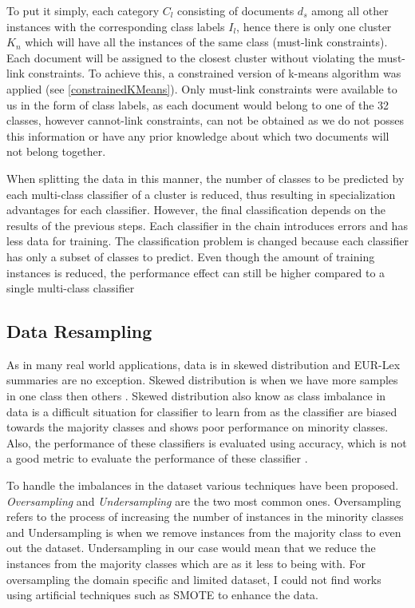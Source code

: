 
To put it simply, each category $C_{l}$ consisting of documents $d_{s}$ among all other instances with the corresponding class labels $I_{l}$, hence there is only one cluster $K_{n}$ which will have all the instances of the same class (must-link constraints). Each document will be assigned to the closest cluster without violating the must-link constraints. To achieve this, a constrained version of k-means algorithm was applied (see \ref{constrainedKMeans}). Only must-link constraints were available to us in the form of class labels, as each document would belong to one of the 32 classes, however cannot-link constraints, can not be obtained as we do not posses this information or have any prior knowledge about which two documents will not belong together. 

When splitting the data in this manner, the number of classes to be predicted by each multi-class classifier of a cluster is reduced, thus resulting in specialization advantages for each classifier. However, the final classification depends on the results of the previous steps. Each classifier in the chain introduces errors and has less data for training. The classification problem is changed because each classifier has only a subset of classes to predict. Even though the amount of training instances is reduced, the performance effect can still be higher compared to a single multi-class classifier

\subsection*{Data Resampling}

As in many real world applications, data is in skewed distribution and EUR-Lex summaries are no exception. Skewed distribution is when we have more samples in one class then others \cite{wang2012multiclass}. Skewed distribution also know as class imbalance in data is a difficult situation for classifier to learn from as the classifier are biased towards the majority classes and shows poor performance on minority classes. Also, the performance of these classifiers is evaluated using accuracy, which is not a good metric to evaluate the performance of these classifier \cite{chawla2002smote}.  

To handle the imbalances in the dataset various techniques have been proposed. \textit{Oversampling} and \textit{Undersampling} are the two most common ones. Oversampling refers to the process of increasing the number of instances in the minority classes and Undersampling is when we remove instances from the majority class to even out the dataset. Undersampling in our case would mean that we reduce the instances from the majority classes which are as it less to being with. For oversampling the domain specific and limited dataset, I could not find works using artificial techniques such as SMOTE to enhance the data. 

